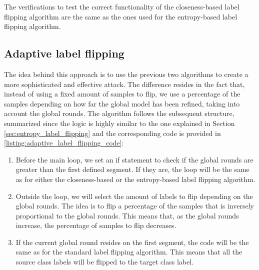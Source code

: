 The verifications to test the correct functionality of the closeness-based label flipping algorithm are the same as the ones used for the entropy-based label flipping algorithm.

\subsection{Adaptive label flipping}
The idea behind this approach is to use the previous two algorithms to create a more sophisticated and effective attack. The difference resides in the fact that, instead of using a fixed amount of samples to flip, we use a percentage of the samples depending on how far the global model has been refined, taking into account the global rounds. The algorithm follows the subsequent structure, summarized since the logic is highly similar to the one explained in Section \ref{sec:entropy_label_flipping} and the corresponding code is provided in \autoref{listing:adaptive_label_flipping_code}:
\begin{enumerate}
        \item Before the main loop, we set an if statement to check if the global rounds are greater than the first defined segment. If they are, the loop will be the same as for either the closeness-based or the entropy-based label flipping algorithm. 
        \item Outside the loop, we will select the amount of labels to flip depending on the global rounds. The idea is to flip a percentage of the samples that is inversely proportional to the global rounds. This means that, as the global rounds increase, the percentage of samples to flip decreases.
        \item If the current global round resides on the first segment, the code will be the same as for the standard label flipping algorithm. This means that all the source class labels will be flipped to the target class label.
\end{enumerate}



